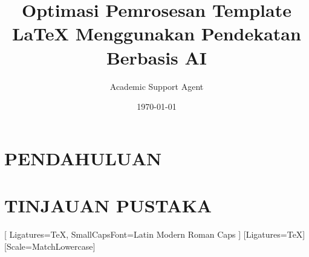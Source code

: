 \documentclass{scrbook}
\title{Optimasi Pemrosesan Template LaTeX Menggunakan Pendekatan Berbasis AI}
\author{Academic Support Agent}
\date{\today}
\begin{document}
\maketitle

\begin{abstract}

\end{abstract}

\chapter{PENDAHULUAN}


\chapter{TINJAUAN PUSTAKA}




\usepackage[spanish,es-nolists,es-tabla,es-noindentfirst]{babel}
\usepackage[hidelinks]{hyperref}

\renewcommand{\listtablename}{Índice de tablas}    
\renewcommand{\listfigurename}{Índice de figuras}
\newcommand*{\listofloaname}{Índice de algoritmos}

\addto\extrasspanish{
    \renewcommand{\sectionautorefname}{Apartado}
    \renewcommand{\subsectionautorefname}{Apartado}
    \renewcommand{\subsubsectionautorefname}{Apartado}
}

\usepackage{geometry}
\geometry{left=2cm, right=2cm, top=2cm, bottom=3.3cm}



\usepackage{fontspec}
\usepackage{amsmath}
\usepackage{unicode-math}   %

\setmainfont{Latin Modern Sans}[
    Ligatures=TeX,
    SmallCapsFont=Latin Modern Roman Caps
]
\setsansfont{Latin Modern Sans}[Ligatures=TeX]
\setmonofont{Source Code Pro}[Scale=MatchLowercase]
\end{document}

